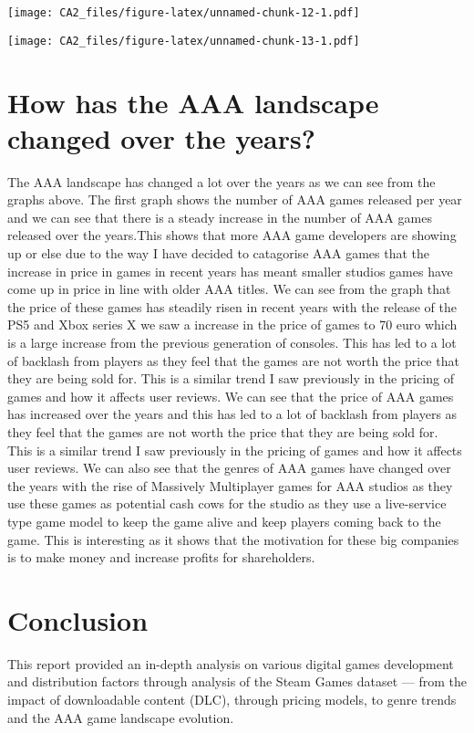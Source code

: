 \documentclass[
]{article}
\begin{document}
\texttt{[image: CA2\_files/figure-latex/unnamed-chunk-12-1.pdf]}

\texttt{[image: CA2\_files/figure-latex/unnamed-chunk-13-1.pdf]}

\section{How has the AAA landscape changed over the
years?}\label{how-has-the-aaa-landscape-changed-over-the-years-1}

The AAA landscape has changed a lot over the years as we can see from
the graphs above. The first graph shows the number of AAA games released
per year and we can see that there is a steady increase in the number of
AAA games released over the years.This shows that more AAA game
developers are showing up or else due to the way I have decided to
catagorise AAA games that the increase in price in games in recent years
has meant smaller studios games have come up in price in line with older
AAA titles. We can see from the graph that the price of these games has
steadily risen in recent years with the release of the PS5 and Xbox
series X we saw a increase in the price of games to 70 euro which is a
large increase from the previous generation of consoles. This has led to
a lot of backlash from players as they feel that the games are not worth
the price that they are being sold for. This is a similar trend I saw
previously in the pricing of games and how it affects user reviews. We
can see that the price of AAA games has increased over the years and
this has led to a lot of backlash from players as they feel that the
games are not worth the price that they are being sold for. This is a
similar trend I saw previously in the pricing of games and how it
affects user reviews. We can also see that the genres of AAA games have
changed over the years with the rise of Massively Multiplayer games for
AAA studios as they use these games as potential cash cows for the
studio as they use a live-service type game model to keep the game alive
and keep players coming back to the game. This is interesting as it
shows that the motivation for these big companies is to make money and
increase profits for shareholders.

\section{Conclusion}\label{conclusion}

This report provided an in-depth analysis on various digital games
development and distribution factors through analysis of the Steam Games
dataset --- from the impact of downloadable content (DLC), through
pricing models, to genre trends and the AAA game landscape evolution.
\end{document}
